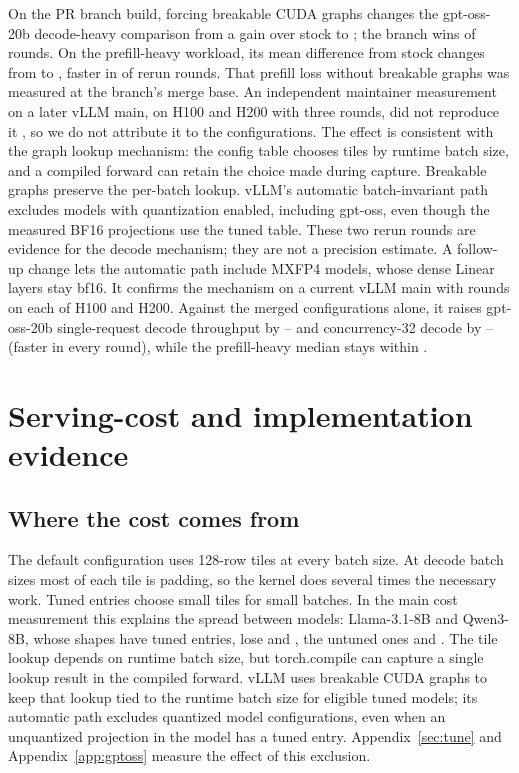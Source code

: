 On the PR branch build, forcing breakable CUDA graphs changes the gpt-oss-20b decode-heavy comparison from a \GptossNoBreakDecGain{} gain over stock to \GptossBreakDecGain{}; the branch wins \GptossBreakDecWins{} of \GptossBreakRounds{} rounds. On the prefill-heavy workload, its mean difference from stock changes from \GptossNoBreakPreGain{} to \GptossBreakPreGain{}, faster in \GptossBreakPreWins{} of \GptossBreakRounds{} rerun rounds. That prefill loss without breakable graphs was measured at the branch's merge base. An independent maintainer measurement on a later vLLM main, on H100 and H200 with three rounds, did not reproduce it \citep{vllm65931}, so we do not attribute it to the configurations. The effect is consistent with the graph lookup mechanism: the config table chooses tiles by runtime batch size, and a compiled forward can retain the choice made during capture. Breakable graphs preserve the per-batch lookup. vLLM's automatic batch-invariant path excludes models with quantization enabled, including gpt-oss, even though the measured BF16 projections use the tuned table. These two rerun rounds are evidence for the decode mechanism; they are not a precision estimate. A follow-up change lets the automatic path include MXFP4 models, whose dense Linear layers stay bf16. It confirms the mechanism on a current vLLM main with \OssGateRounds{} rounds on each of H100 and H200. Against the merged configurations alone, it raises gpt-oss-20b single-request decode throughput by \OssGateDecOneMin{}--\OssGateDecOneMax{} and concurrency-32 decode by \OssGateDecMin{}--\OssGateDecMax{} (faster in every round), while the prefill-heavy median stays within \OssGatePreAbsMax{}.

\section{Serving-cost and implementation evidence}\label{app:serving}
\subsection{Where the cost comes from}\label{sec:cost}
The default configuration uses 128-row tiles at every batch size. At decode batch sizes most of each tile is padding, so the kernel does several times the necessary work. Tuned entries choose small tiles for small batches. In the main cost measurement this explains the spread between models: Llama-3.1-8B and Qwen3-8B, whose shapes have tuned entries, lose \LlamaStock{} and \QthreeStock{}, the untuned ones \QsevenStock{} and \GemmaStock{}. The tile lookup depends on runtime batch size, but torch.compile can capture a single lookup result in the compiled forward. vLLM uses breakable CUDA graphs to keep that lookup tied to the runtime batch size for eligible tuned models; its automatic path excludes quantized model configurations, even when an unquantized projection in the model has a tuned entry. Appendix~\ref{sec:tune} and Appendix~\ref{app:gptoss} measure the effect of this exclusion.



